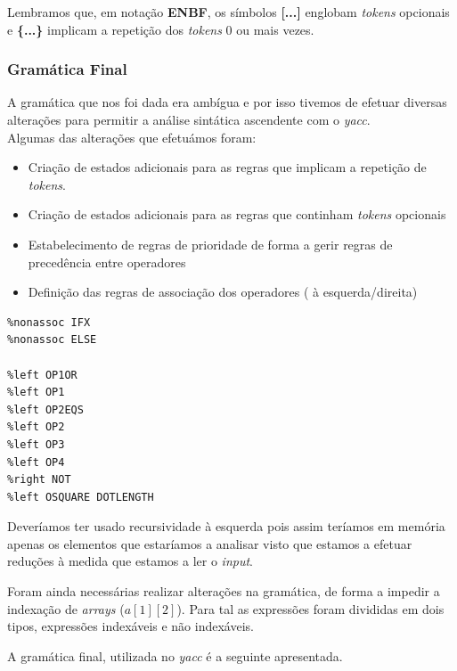 \documentclass[12pt]{article}
\begin{document}
\vspace{0.5cm}

Lembramos que, em notação \textbf{ENBF}, os símbolos \textbf{[...]} englobam \emph{tokens} opcionais e \textbf{\{...\}} implicam a repetição dos \emph{tokens} 0 ou mais vezes.



\subsubsection{Gramática Final}
\par A gramática que nos foi dada era ambígua e por isso tivemos de efetuar diversas alterações para permitir a análise sintática ascendente com o \emph{yacc}.\\
Algumas das alterações que efetuámos foram:
\begin{itemize}
	\item Criação de estados adicionais para as regras que implicam a repetição de \emph{tokens}.
	\item Criação de estados adicionais para as regras que continham \emph{tokens} opcionais
	\item Estabelecimento de regras de prioridade de forma a gerir regras de precedência entre operadores
	\item Definição das regras de associação dos operadores ( à esquerda/direita)
\end{itemize}

\lstset{language=c,caption=Associação de Operadores,label=Estruturas2}
\begin{lstlisting}
%nonassoc IFX
%nonassoc ELSE

%left OP1OR
%left OP1
%left OP2EQS
%left OP2
%left OP3
%left OP4
%right NOT
%left OSQUARE DOTLENGTH
\end{lstlisting}  


Deveríamos ter usado recursividade  à esquerda pois assim teríamos em memória apenas os elementos que estaríamos a analisar visto que estamos a efetuar reduções à medida que estamos a ler o \emph{input}.
\par Foram ainda necessárias realizar alterações na gramática, de forma a impedir a indexação de \emph{arrays} ($a[1][2]$). Para tal as expressões foram divididas em dois tipos, expressões indexáveis e não indexáveis.


A gramática final, utilizada no \emph{yacc} é a seguinte apresentada.
\end{document}
